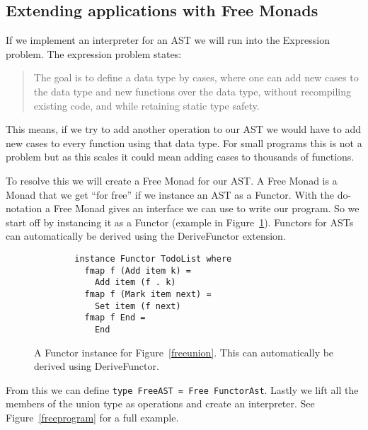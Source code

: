 \documentclass[12pt]{report}
\theoremstyle{definition}
\theoremstyle{theorem}
\begin{document}
\subsection{Extending applications with Free Monads}


If we implement an interpreter for an AST we will run into the Expression
problem. The expression problem states:

\blockquote{The goal is to define a data type by cases, where one can add new
cases to the data type and new functions over the data type, without recompiling
existing code, and while retaining static type safety.}

This means, if we try to add another operation to our AST we would have to add
new cases to every function using that data type. For small programs this is not
a problem but as this scales it could mean adding cases to thousands of
functions. 

To resolve this we will create a Free Monad for our AST. A Free Monad is a Monad
that we get ``for free'' if we instance an AST as a Functor. With the
do-notation a Free Monad gives an interface we can use to write our program. So
we start off by instancing it as a Functor (example in
Figure~\ref{freefunctor}). Functors for ASTs can automatically be derived using
the DeriveFunctor extension.~\cite{commentarycompiler}

\begin{figure}[H]
    \begin{lstlisting}
        instance Functor TodoList where
          fmap f (Add item k) = 
            Add item (f . k)
          fmap f (Mark item next) = 
            Set item (f next)
          fmap f End = 
            End
    \end{lstlisting}
    \label{freefunctor}
    \caption{A Functor instance for Figure~\ref{freeunion}. This can
    automatically be derived using DeriveFunctor.}
\end{figure}

From this we can define \texttt{type FreeAST = Free FunctorAst}. Lastly we lift
all the members of the union type as operations and create an interpreter. See
Figure~\ref{freeprogram} for a full example.
\end{document}
